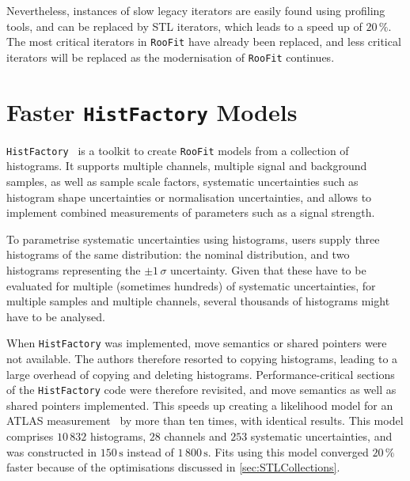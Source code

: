 \documentclass[a4paper]{jpconf}
\newcommand{\RooFit}{\texttt{RooFit}\xspace}
\newcommand{\HistFactory}{\texttt{HistFactory}\xspace}
\begin{document}
Nevertheless, instances of slow legacy iterators are easily found using profiling tools, and can be replaced by STL
iterators, which leads to a speed up of $20\,\%$. The most critical iterators in \RooFit have already been replaced,
and less critical iterators will be replaced as the modernisation of \RooFit continues.





\section{Faster \HistFactory Models}
\HistFactory~\cite{HistFactory} is a toolkit to create \RooFit models from a collection of histograms. It supports multiple channels,
multiple signal and background samples, as well as sample scale factors, systematic uncertainties such as histogram shape uncertainties or
normalisation uncertainties, and allows to implement combined measurements of parameters such as a signal strength.

To parametrise systematic uncertainties using histograms, users supply three histograms of the same distribution: the nominal distribution,
and two histograms representing the $\pm 1\, \sigma$ uncertainty. Given that these have to be evaluated for multiple (sometimes hundreds) of
systematic uncertainties, for multiple samples and multiple channels, several thousands of histograms might have to be analysed.

When \HistFactory was implemented, move semantics or shared pointers were not available. The authors therefore resorted to copying
histograms, leading to a large overhead of copying and deleting histograms. Performance-critical sections of 
the \HistFactory code were therefore revisited, and move semantics as well as shared pointers implemented. This speeds up creating a likelihood
model for an ATLAS measurement~\cite{Hbb} by more than ten times, with identical results. This model comprises $10\,832$
histograms, $28$ channels and $253$ systematic uncertainties, and was constructed in $150\,\mathrm{s}$ instead of $1\,800\,\mathrm{s}$. Fits using this model
converged $20\,\%$ faster because of the optimisations discussed in \cref{sec:STLCollections}.
\end{document}
